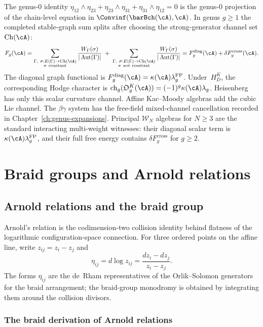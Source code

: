 The genus-$0$ identity
$\eta_{12} \wedge \eta_{23} + \eta_{23} \wedge \eta_{31}
+ \eta_{31} \wedge \eta_{12}=0$ is the genus-$0$ projection of the
chain-level equation in $\Convinf(\barBch(\cA),\cA)$.  In genus
$g\geq1$ the completed stable-graph sum splits after choosing the
strong-generator channel set $\mathrm{Ch}(\cA)$:
\[
F_g(\cA)
=
\sum_{\substack{\Gamma,\ \sigma:E(\Gamma)\to\mathrm{Ch}(\cA)\\
                \sigma\ \mathrm{constant}}}
\frac{W_\Gamma(\sigma)}{|\operatorname{Aut}(\Gamma)|}
\;+\;
\sum_{\substack{\Gamma,\ \sigma:E(\Gamma)\to\mathrm{Ch}(\cA)\\
                \sigma\ \mathrm{not\ constant}}}
\frac{W_\Gamma(\sigma)}{|\operatorname{Aut}(\Gamma)|}
=F_g^{\mathrm{diag}}(\cA)+\delta F_g^{\mathrm{cross}}(\cA).
\]
The diagonal graph functional is
$F_g^{\mathrm{diag}}(\cA)=\kappa(\cA)\lambda_g^{\mathrm{FP}}$.
Under~$H_D^K$, the corresponding Hodge character is
$\operatorname{ch}_g(\mathfrak O_g^K(\cA))=
(-1)^g\kappa(\cA)\lambda_g$.
Heisenberg has only this scalar curvature channel.  Affine
Kac--Moody algebras add the cubic Lie channel.  The $\beta\gamma$
system has the free-field mixed-channel cancellation recorded in
Chapter~\ref{ch:genus-expansions}.  Principal $\mathcal W_N$ algebras
for $N\geq 3$ are the standard interacting multi-weight witnesses:
their diagonal scalar term is $\kappa(\cA)\lambda_g^{\mathrm{FP}}$, and their full
free energy contains $\delta F_g^{\mathrm{cross}}$ for $g\geq 2$.

\section{Braid groups and Arnold relations}

\subsection{Arnold relations and the braid group}

Arnold's relation is the codimension-two collision identity behind
flatness of the logarithmic configuration-space connection.  For
three ordered points on the affine line, write
$z_{ij}=z_i-z_j$ and
\[
\eta_{ij}=d\log z_{ij}=\frac{dz_i-dz_j}{z_i-z_j}.
\]
The forms $\eta_{ij}$ are the de~Rham representatives of the
Orlik--Solomon generators for the braid arrangement; the braid-group
monodromy is obtained by integrating them around the collision
divisors.

\subsubsection{The braid derivation of Arnold relations}

